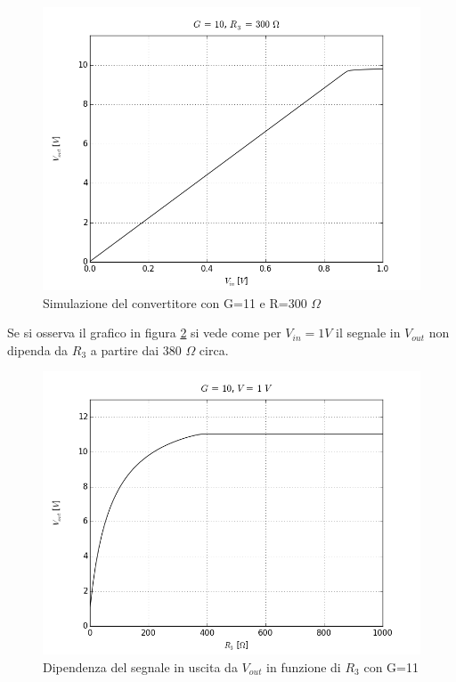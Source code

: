 \documentclass[journal, a4paper]{IEEEtran}
\begin{document}
\begin{figure}[htp]
\centering
\includegraphics[scale=.35]{g_10_r_300_dc_v}
\caption{Simulazione del convertitore con G=11 e R=300 $\Omega$}
\label{g_10_r_300_dc_v}
\end{figure} 

Se si osserva il grafico in figura \ref{g_10_v_1_dc_r} si vede come per $V_{in} = 1 V$ il segnale in $V_{out}$ non dipenda da $R_3$ a partire dai 380 $\Omega$ circa.

\begin{figure}[htp]
\includegraphics[scale=.4]{g_10_v_1_dc_r}
\caption{Dipendenza del segnale in uscita da $V_{out}$ in funzione di $R_3$ con G=11}
\label{g_10_v_1_dc_r} 
\end{figure}
\end{document}
